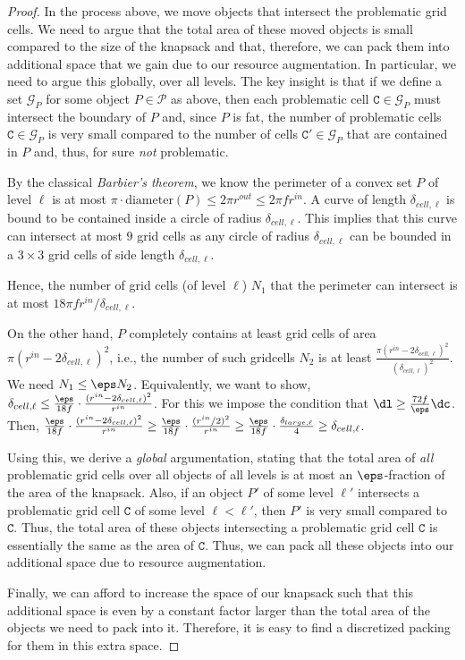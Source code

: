 \documentclass[10pt,a4paper]{article}
\theoremstyle{plain}
\theoremstyle{plain}
\theoremstyle{plain}
\theoremstyle{definition}
\newcommand{\arir}[1]{}
\newcommand{\ari}[1]{#1}
\newcommand{\ag}[1]{#1}
\begin{document}
\begin{proof}
	In the process above, we move objects that intersect the problematic grid
	cells. We need to argue that the total area of these moved objects
	is small compared to the size of the knapsack and that, therefore,
	we can pack them into additional space that we gain due to our resource
	augmentation. In particular, we need to argue this globally, over
	all levels. The key insight is that if we define a set $\mathcal{G}_{P}$
	for some object $P\in\mathcal{P}$ as above, then each problematic
	cell $\texttt{C}  \in\mathcal{G}_{P}$ must intersect the boundary of $P$ and,
	since $P$ is fat, the number of problematic cells $ \texttt{C} \in\mathcal{G}_{P}$
	is very small compared to the number of cells $\texttt{C}' \in\mathcal{G}_{P}$
	that are contained in $P$ and, thus, for sure \emph{not }problematic.
	
	\arir{Check these calculations}
	\ari{By the classical {\em Barbier's theorem}, we know  the perimeter of a convex set $P$ of level $\ell$ is at most $\pi \cdot \text{diameter}(P) \le 2\pi r^{out} \le 2\pi f r^{in}$.}
	\ag{A curve of length $\delta_{cell, \ell}$ is bound to be contained inside a circle of radius $\delta_{cell, \ell}$. This implies that this curve can intersect at most $9$ grid cells as any circle of radius $\delta_{cell, \ell}$ can be bounded in a $3\times 3$ grid cells of side length $\delta_{cell, \ell}$.}
	\ag{
		Hence, the number of grid cells (of level $\ell$) $N_1$ that the perimeter can intersect is at most $18\pi f r^{in}/\delta_{cell,\ell}$. }
	\ari{
		On the other hand, $P$ completely contains at least grid cells of area $\pi (r^{in}-2\delta_{cell, \ell})^2$, 
		i.e., the number of such gridcells $N_2$ is at least $\frac{\pi (r^{in}-2\delta_{cell, \ell})^2}{(\delta_{cell, \ell})^2}$.
		We need $N_1 \le \eps N_2$.}
	\ag{Equivalently, we want to show, $\delta_{cell, \ell} \le \frac{\eps}{18f} \cdot \frac{(r^{in}-2\delta_{cell, \ell})^2}{r^{in}}$.
		For this we impose the condition that $\dl \ge \frac{72f}{\eps} \dc$.
		Then, $\frac{\eps}{18f} \cdot \frac{(r^{in}-2\delta_{cell, \ell})^2}{r^{in}} \ge \frac{\eps}{18f} \cdot \frac{(r^{in}/2)^2}{r^{in}}\ge  \frac{\eps}{18f} \cdot \frac{\delta_{large, \ell}}{4} \ge \delta_{cell, \ell}$.}
	
	
	
	Using this, we derive a \emph{global }argumentation, stating that
	the total area of \emph{all} problematic grid cells over all objects
	of all levels is at most an $\eps$-fraction of the area of the
	knapsack. Also, if an object $P'$ of some level $\ell'$ intersects
	a problematic grid cell $\texttt{C}$ of some level $\ell<\ell'$, then $P'$
	is very small compared to $\texttt{C}$. Thus, the total area of these objects
	intersecting a problematic grid cell $\texttt{C}$ is essentially the same
	as the area of $\texttt{C}$. Thus, we can pack all these objects into our
	additional space due to resource augmentation.
	
	Finally, we can afford to increase the space of our knapsack such
	that this additional space is even by a constant factor larger than
	the total area of the objects we need to pack into it. Therefore,
	it is easy to find a discretized packing for them in this extra space.
\end{proof}
\end{document}
